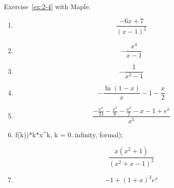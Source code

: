 \begin{exercise}
    Exercise~\ref{ex:2-4} with Maple.
\end{exercise}
\begin{solution}
    \begin{enumerate}[label=(\alph*)]
        \item \begin{mapleinput}
\end{mapleinput} \begin{mapleoutput}
    \[\frac{-6 x+7}{\left(x-1\right)^{2}}\]
\end{mapleoutput}
\item \begin{mapleinput}
\end{mapleinput} \begin{mapleoutput}
    \[-\frac{x^{4}}{x-1}\]
\end{mapleoutput} \item \begin{mapleinput}
\end{mapleinput} \begin{mapleoutput}
    \[-\frac{1}{x^{2}-1}\]
\end{mapleoutput} \item \begin{mapleinput}
\end{mapleinput} \begin{mapleoutput}
    \[-\frac{\ln\! \left(1-x\right)}{x}-1-\frac{x}{2}\]
\end{mapleoutput} \item \begin{mapleinput}
\end{mapleinput} \begin{mapleoutput}
    \[\frac{-\frac{x^{4}}{24}-\frac{x^{3}}{6}-\frac{x^{2}}{2}-x-1+e^{x}}{x^{5}}\]
\end{mapleoutput} \item \begin{mapleinput}
  f(k))*k*x^k, k = 0..infinity, formal);
\end{mapleinput} \begin{mapleoutput}
    \[\frac{x \left(x^{2}+1\right)}{\left(x^{2}+x-1\right)^{2}}\]
\end{mapleoutput} \item \begin{mapleinput}
\end{mapleinput} \begin{mapleoutput}
    \[-1+\left(1+x\right)^{2} e^{x}\]
\end{mapleoutput}
    \end{enumerate}
\end{solution}

